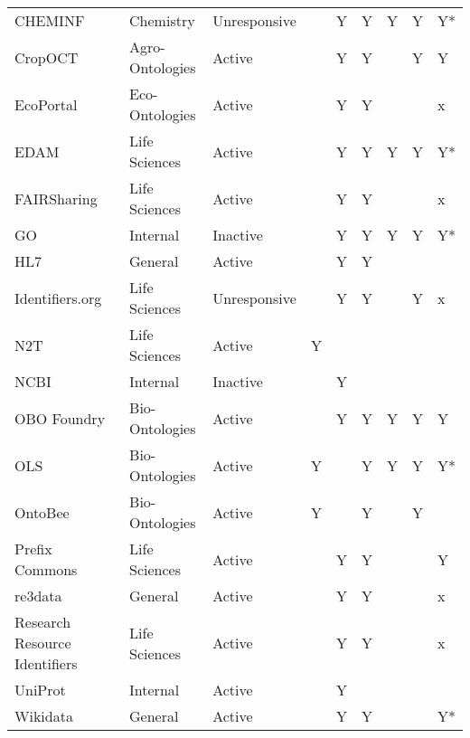 \begin{table}
\begin{tabular}{lllllllll}
CHEMINF~\cite{Hastings2011} & Chemistry & Unresponsive &  & Y & Y & Y & Y & Y* \\
CropOCT~\cite{Arnaud2020} & Agro-Ontologies & Active &  & Y & Y &  & Y & Y \\
EcoPortal~\cite{Kechagioglou2021} & Eco-Ontologies & Active &  & Y & Y &  &  & x \\
EDAM~\cite{Ison2013} & Life Sciences & Active &  & Y & Y & Y & Y & Y* \\
FAIRSharing~\cite{Sansone2019} & Life Sciences & Active &  & Y & Y &  &  & x \\
GO~\cite{TheGeneOntologyConsortium2019} & Internal & Inactive &  & Y & Y & Y & Y & Y* \\
HL7~\cite{Bender2013} & General & Active &  & Y & Y &  &  &  \\
Identifiers.org~\cite{Juty2012} & Life Sciences & Unresponsive &  & Y & Y &  & Y & x \\
N2T~\cite{Wimalaratne2018} & Life Sciences & Active & Y &  &  &  &  &  \\
NCBI~\cite{Clark2016} & Internal & Inactive &  & Y &  &  &  &  \\
OBO Foundry~\cite{Jackson2021} & Bio-Ontologies & Active &  & Y & Y & Y & Y & Y \\
OLS~\cite{Cote2006a} & Bio-Ontologies & Active & Y &  & Y & Y & Y & Y* \\
OntoBee~\cite{Ong2017} & Bio-Ontologies & Active & Y &  & Y &  & Y &  \\
Prefix Commons~\cite{prefixcommons} & Life Sciences & Active &  & Y & Y &  &  & Y \\
re3data~\cite{Pampel2013} & General & Active &  & Y & Y &  &  & x \\
Research Resource Identifiers & Life Sciences & Active &  & Y & Y &  &  & x \\
UniProt~\cite{Bateman2021} & Internal & Active &  & Y &  &  &  &  \\
Wikidata~\cite{Waagmeester2020} & General & Active &  & Y & Y &  &  & Y* \\
\bottomrule
\end{tabular}
\end{table}
